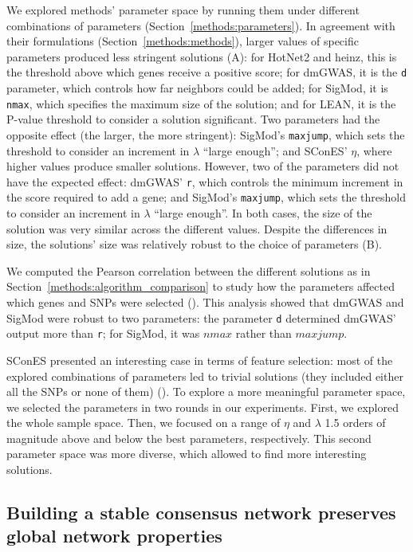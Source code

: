 \documentclass[10pt,letterpaper]{article}
\begin{document}
We explored methods' parameter space by running them under different combinations of parameters (Section~\ref{methods:parameters}). In agreement with their formulations (Section~\ref{methods:methods}), larger values of specific parameters produced less stringent solutions (A): for HotNet2 and heinz, this is the threshold above which genes receive a positive score; for dmGWAS, it is the \texttt{d} parameter, which controls how far neighbors could be added; for SigMod, it is \texttt{nmax}, which specifies the maximum size of the solution; and for LEAN, it is the P-value threshold to consider a solution significant. Two parameters had the opposite effect (the larger, the more stringent): SigMod's \texttt{maxjump}, which sets the threshold to consider an increment in $\lambda$ ``large enough''; and SConES' $\eta$, where higher values produce smaller solutions. However, two of the parameters did not have the expected effect: dmGWAS' \texttt{r}, which controls the minimum increment in the score required to add a gene; and SigMod's \texttt{maxjump}, which sets the threshold to consider an increment in $\lambda$ ``large enough''. In both cases, the size of the solution was very similar across the different values. Despite the differences in size, the solutions' size was relatively robust to the choice of parameters (B).

We computed the Pearson correlation between the different solutions as in Section~\ref{methods:algorithm_comparison} to study how the parameters affected which genes and SNPs were selected (). This analysis showed that dmGWAS and SigMod were robust to two parameters: the parameter \texttt{d} determined dmGWAS' output more than \texttt{r}; for SigMod, it was $nmax$ rather than $maxjump$.

SConES presented an interesting case in terms of feature selection: most of the explored combinations of parameters led to trivial solutions (they included either all the SNPs or none of them) (). To explore a more meaningful parameter space, we selected the parameters in two rounds in our experiments. First, we explored the whole sample space. Then, we focused on a range of $\eta$ and $\lambda$ 1.5 orders of magnitude above and below the best parameters, respectively. This second parameter space was more diverse, which allowed to find more interesting solutions.

\subsection{Building a stable consensus network preserves global network properties}
\label{results:stable-consensus}
\end{document}
